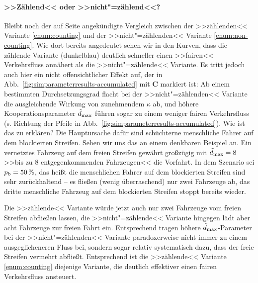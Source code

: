 \paragraph{>>Zählend<< oder >>nicht"=zählend<<?}\label{sec:counting-vs-noncounting} Bleibt noch der auf Seite \pageref{enum:counting} angekündigte Vergleich zwischen der >>zählenden<< Variante \ref{enum:counting} und der >>nicht"=zählenden<< Variante \ref{enum:non-counting}. Wie dort bereits angedeutet sehen wir in den Kurven, dass die zählende Variante (dunkelblau) deutlich schneller einen >>fairen<< Verkehrsfluss annähert als die >>nicht"=zählende<< Variante. Es tritt jedoch auch hier ein nicht offensichtlicher Effekt auf, der in Abb.~\ref{fig:simparameterresults-accumulated} mit \textbf{C} markiert ist: Ab einem bestimmten Durchsetzungsgrad flacht bei der >>nicht"=zählenden<< Variante die ausgleichende Wirkung von zunehmendem $\kappa$ ab, und höhere Kooperationsparameter $\tilde{d}_{\text{max}}$ führen sogar zu einem weniger fairen Verkehrsfluss (s. Richtung der Pfeile in Abb.~\ref{fig:simparameterresults-accumulated}). Wie ist das zu erklären? Die Hauptursache dafür sind schüchterne menschliche Fahrer auf dem blockierten Streifen. Sehen wir uns das an einem denkbaren Beispiel an. Ein vernetztes Fahrzeug auf dem freien Streifen gewährt großzügig mit $\tilde{d}_{\text{max}}=8$ >>bis zu 8 entgegenkommenden Fahrzeugen<< die Vorfahrt. In dem Szenario sei $p_{\text{b}} = 50\,\%$, das heißt die menschlichen Fahrer auf dem blockierten Streifen sind sehr zurückhaltend -- es fließen (wenig überraschend) nur zwei Fahrzeuge ab, das dritte menschliche Fahrzeug auf dem blockierten Streifen stoppt bereits wieder.

Die >>zählende<< Variante würde jetzt auch nur zwei Fahrzeuge vom freien Streifen abfließen lassen, die >>nicht"=zählende<< Variante hingegen lädt aber acht Fahrzeuge zur freien Fahrt ein. Entsprechend tragen höhere $\tilde{d}_{\text{max}}$-Parameter bei der >>nicht"=zählenden<< Variante paradoxerweise nicht immer zu einem ausgeglicheneren Fluss bei, sondern sogar relativ systematisch dazu, dass der freie Streifen vermehrt abfließt. Entsprechend ist die >>zählende<< Variante \ref{enum:counting} diejenige Variante, die deutlich effektiver einen fairen Verkehrsfluss ansteuert.



